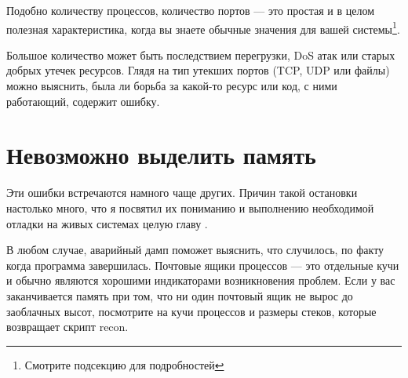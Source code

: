 Подобно количеству процессов, количество портов --- это простая и в целом полезная характеристика, когда вы знаете обычные значения для вашей системы\footnote{Смотрите подсекцию  для подробностей}.

Большое количество может быть последствием перегрузки, DoS атак или старых добрых утечек ресурсов. Глядя на тип утекших портов (TCP, UDP или файлы) можно выяснить, была ли борьба за какой-то ресурс или код, с ними работающий, содержит ошибку.


\section{Невозможно выделить память}

Эти ошибки встречаются намного чаще других. Причин такой остановки настолько много, что я посвятил их пониманию и выполнению необходимой отладки на живых системах целую главу .

В любом случае, аварийный дамп поможет выяснить, что случилось, по факту когда программа завершилась. Почтовые ящики процессов --- это отдельные кучи и обычно являются хорошими индикаторами возникновения проблем. Если у вас заканчивается память при том, что ни один почтовый ящик не вырос до заоблачных высот, посмотрите на кучи процессов и размеры стеков, которые возвращает скрипт recon.

